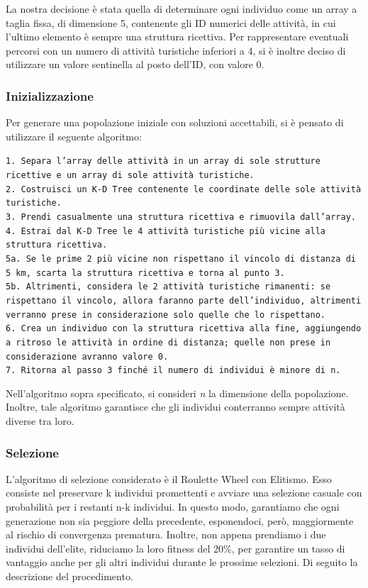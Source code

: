 \documentclass{CSUniSchoolLabReport}
\begin{document}
La nostra decisione è stata quella di determinare ogni individuo come un array a taglia fissa, di dimensione 5, contenente gli ID numerici delle attività, in cui l'ultimo elemento è sempre una struttura ricettiva. Per rappresentare eventuali percorsi con un numero di attività turistiche inferiori a 4, si è inoltre deciso di utilizzare un valore sentinella al posto dell'ID, con valore 0.

\subsubsection{Inizializzazione}

Per generare una popolazione iniziale con soluzioni accettabili, si è pensato di utilizzare il seguente algoritmo:

\texttt{1. Separa l'array delle attività in un array di sole strutture ricettive e un array di sole attività turistiche. \\
2. Costruisci un K-D Tree contenente le coordinate delle sole attività turistiche. \\
3. Prendi casualmente una struttura ricettiva e rimuovila dall'array. \\
4. Estrai dal K-D Tree le 4 attività turistiche più vicine alla struttura ricettiva. \\
5a. Se le prime 2 più vicine non rispettano il vincolo di distanza di 5 km, scarta la struttura ricettiva e torna al punto 3. \\
5b. Altrimenti, considera le 2 attività turistiche rimanenti: se rispettano il vincolo, allora faranno parte dell'individuo, altrimenti verranno prese in considerazione solo quelle che lo rispettano. \\
6. Crea un individuo con la struttura ricettiva alla fine, aggiungendo a ritroso le attività in ordine di distanza; quelle non prese in considerazione avranno valore 0. \\
7. Ritorna al passo 3 finché il numero di individui è minore di n. 
}

Nell'algoritmo sopra specificato, si consideri \textit{n} la dimensione della popolazione. \\
Inoltre, tale algoritmo garantisce che gli individui conterranno sempre attività diverse tra loro.

\subsubsection{Selezione}

L'algoritmo di selezione considerato è il Roulette Wheel con Elitismo. Esso consiste nel preservare k individui promettenti e avviare una selezione casuale con probabilità per i restanti n-k individui. In questo modo, garantiamo che ogni generazione non sia peggiore della precedente, esponendoci, però, maggiormente al rischio di convergenza prematura. Inoltre, non appena prendiamo i due individui dell'elite, riduciamo la loro fitness del 20\%, per garantire un tasso di vantaggio anche per gli altri individui durante le prossime selezioni.
Di seguito la descrizione del procedimento.
\end{document}
